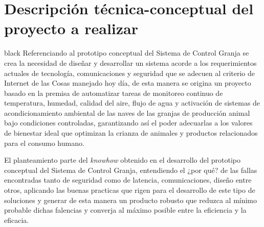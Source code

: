 \documentclass[11pt]{charter}
\begin{document}
\section{Descripción técnica-conceptual del proyecto a realizar}
\label{sec:descripcion}

\begin{consigna}{black} 
Referenciando al prototipo conceptual del Sistema de Control Granja se crea la necesidad de diseñar y desarrollar un sistema acorde a los requerimientos actuales de tecnología, comunicaciones y seguridad que se adecuen al criterio de Internet de las Cosas manejado hoy día, de esta manera se origina un proyecto basado en la premisa de automatizar tareas de monitoreo continuo de temperatura, humedad, calidad del aire, flujo de agua y activación de sistemas de acondicionamiento ambiental de las naves de las granjas de producción animal bajo condiciones controladas, garantizando así el poder adecuarlas a los valores de bienestar ideal que optimizan la crianza de animales y productos relacionados para el consumo humano. 

El planteamiento parte del \textit{knowhow} obtenido en el desarrollo del prototipo conceptual del Sistema de Control Granja, entendiendo el ¿por qué? de las fallas encontradas tanto de seguridad como de latencia, comunicaciones, diseño entre otros, aplicando las buenas practicas que rigen para el desarrollo de este tipo de soluciones y generar de esta manera un producto robusto que reduzca al mínimo probable dichas falencias y converja al máximo posible entre la eficiencia y la eficacia.


\end{consigna}
\end{document}
